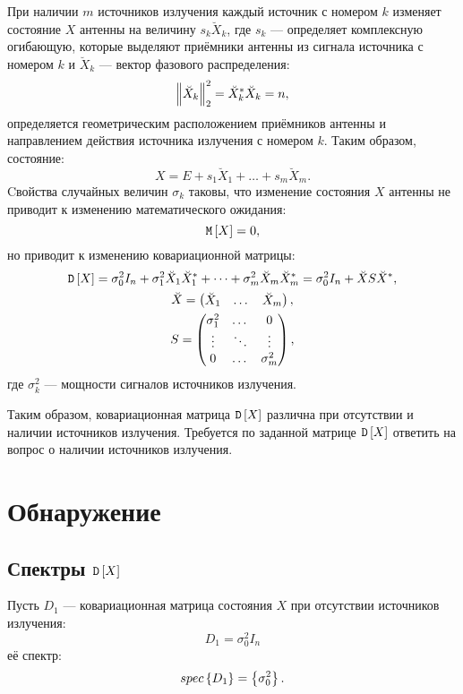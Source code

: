 При наличии $m$ источников излучения каждый источник с номером $k$ изменяет состояние $X$ антенны на величину $s_k \breve{X}_k$, где $s_k$ --- определяет комплексную огибающую,
которые выделяют приёмники антенны из сигнала источника с номером $k$ и $\breve{X}_k$ --- вектор фазового распределения:
\[
    \left \| \breve{X}_k \right \|_{2}^2
    = \breve{X}_k^* \breve{X}_k
    = n,
\]
определяется геометрическим расположением приёмников антенны и направлением действия источника излучения с номером $k$. Таким образом, состояние:
\[
    X = E + s_1 \breve{X}_1 + \dots + s_m \breve{X}_m .
\]
Cвойства случайных величин $\sigma_k$ таковы, что изменение состояния $X$ антенны не приводит к изменению математического ожидания:
\[
    \mathtt{M} \left[ X \right] = 0,
\]
но приводит к изменению ковариационной матрицы:
\begin{gather*}
    \mathtt{D} \left[ X \right]
    = \sigma_0^2 I_n + \sigma_1^2 \breve{X}_1 \breve{X}_1^* + \dots + \sigma_m^2 \breve{X}_m \breve{X}_m^*
    = \sigma_0^2 I_n + \breve{X} S \breve{X}^* , \\
    \breve{X}
    = \begin{pmatrix}
        \breve{X}_1 & \dots & \breve{X}_m
    \end{pmatrix}, \\
    S = \begin{pmatrix}
        \sigma_1^2 & \dots  & 0          \\
        \vdots     & \ddots & \vdots     \\
        0          & \dots  & \sigma_m^2
    \end{pmatrix} ,
\end{gather*}
где $\sigma_k^2$ --- мощности сигналов источников излучения.

Таким образом, ковариационная матрица $\mathtt{D} \left[ X \right]$ различна при отсутствии и наличии источников излучения. Требуется по заданной матрице $\mathtt{D} \left[ X \right]$ ответить на вопрос о
наличии источников излучения.


\section{Обнаружение}

\subsection{Спектры $\mathtt{D} \left[ X \right]$}

Пусть $D_1$ --- ковариационная матрица состояния $X$ при отсутствии источников излучения:
\[
    D_1 = \sigma_0^2 I_n
\]
её спектр:
\[
    spec \left \{ D_1 \right \} = \left \{ \sigma_0^2 \right \} .
\]

